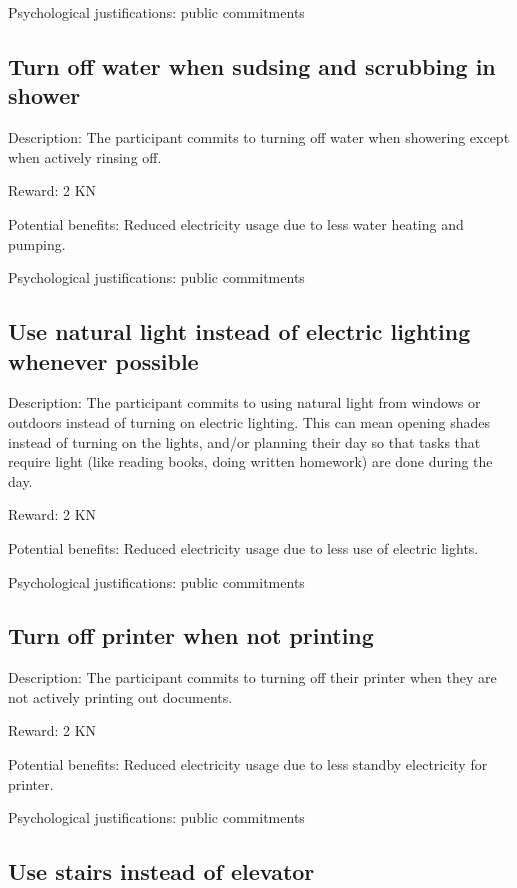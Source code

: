 Psychological justifications: public commitments

\subsection{Turn off water when sudsing and scrubbing in shower}

Description: The participant commits to turning off water when showering except when actively rinsing off.

Reward: 2 KN

Potential benefits: Reduced electricity usage due to less water heating and pumping.

Psychological justifications: public commitments

\subsection{Use natural light instead of electric lighting whenever possible}

Description: The participant commits to using natural light from windows or outdoors instead of turning on electric lighting. This can mean opening shades instead of turning on the lights, and/or planning their day so that tasks that require light (like reading books, doing written homework) are done during the day.

Reward: 2 KN

Potential benefits: Reduced electricity usage due to less use of electric lights.

Psychological justifications: public commitments

\subsection{Turn off printer when not printing}

Description: The participant commits to turning off their printer when they are not actively printing out documents.

Reward: 2 KN

Potential benefits: Reduced electricity usage due to less standby electricity for printer.

Psychological justifications: public commitments

\subsection{Use stairs instead of elevator}

